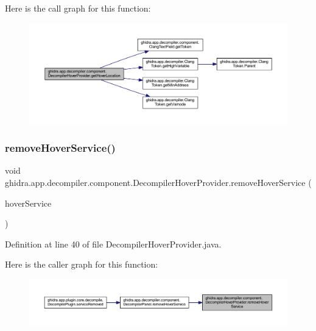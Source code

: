 Here is the call graph for this function\+:
\nopagebreak
\begin{figure}[H]
\begin{center}
\leavevmode
\includegraphics[width=350pt]{classghidra_1_1app_1_1decompiler_1_1component_1_1_decompiler_hover_provider_a204f03a4c27026245c4a1cd3094616b7_cgraph}
\end{center}
\end{figure}
\mbox{\label{classghidra_1_1app_1_1decompiler_1_1component_1_1_decompiler_hover_provider_a215fc1566ed4981c28c380cf19a70b5c}} 
\subsubsection{\texorpdfstring{removeHoverService()}{removeHoverService()}}
{\footnotesize\ttfamily void ghidra.\+app.\+decompiler.\+component.\+Decompiler\+Hover\+Provider.\+remove\+Hover\+Service (\begin{DoxyParamCaption}\item[{\mbox{\hyperlink{interfaceghidra_1_1app_1_1decompiler_1_1component_1_1hover_1_1_decompiler_hover_service}{Decompiler\+Hover\+Service}}}]{hover\+Service }\end{DoxyParamCaption})\hspace{0.3cm}{\ttfamily [inline]}}



Definition at line 40 of file Decompiler\+Hover\+Provider.\+java.

Here is the caller graph for this function\+:
\nopagebreak
\begin{figure}[H]
\begin{center}
\leavevmode
\includegraphics[width=350pt]{classghidra_1_1app_1_1decompiler_1_1component_1_1_decompiler_hover_provider_a215fc1566ed4981c28c380cf19a70b5c_icgraph}
\end{center}
\end{figure}


